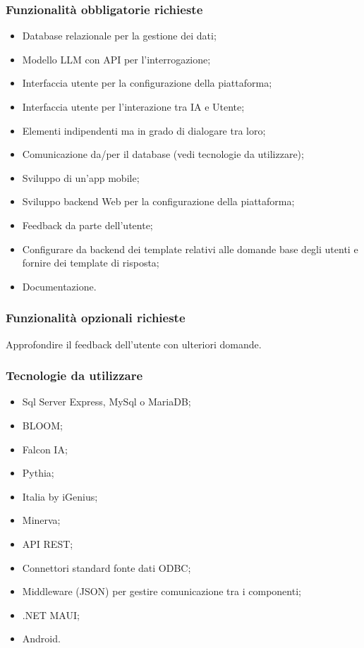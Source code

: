\documentclass[10pt]{article}
\begin{document}
\subsubsection{Funzionalità obbligatorie richieste}
\begin{itemize}
 \item Database relazionale per la gestione dei dati;
 \item Modello LLM con API per l’interrogazione;
 \item Interfaccia utente per la configurazione della piattaforma;
 \item Interfaccia utente per l'interazione tra IA e Utente;
 \item Elementi indipendenti ma in grado di dialogare tra loro;
 \item Comunicazione da/per il database (vedi tecnologie da utilizzare);
 \item Sviluppo di un'app mobile;
 \item Sviluppo backend Web per la configurazione della piattaforma;
 \item Feedback da parte dell’utente;
 \item Configurare da backend dei template relativi alle domande base degli utenti e fornire dei template di risposta;
 \item Documentazione.
\end{itemize}

\subsubsection{Funzionalità opzionali richieste}
Approfondire il feedback dell’utente con ulteriori domande.
\subsubsection{Tecnologie da utilizzare}
\begin{itemize}
    \item Sql Server Express, MySql o MariaDB;
    \item BLOOM;
    \item Falcon IA;
    \item Pythia;
    \item Italia by iGenius;
    \item Minerva;
    \item API REST;
    \item Connettori standard fonte dati ODBC;
    \item Middleware (JSON) per gestire comunicazione tra i componenti;
    \item .NET MAUI;
    \item Android.
\end{itemize}
\end{document}
